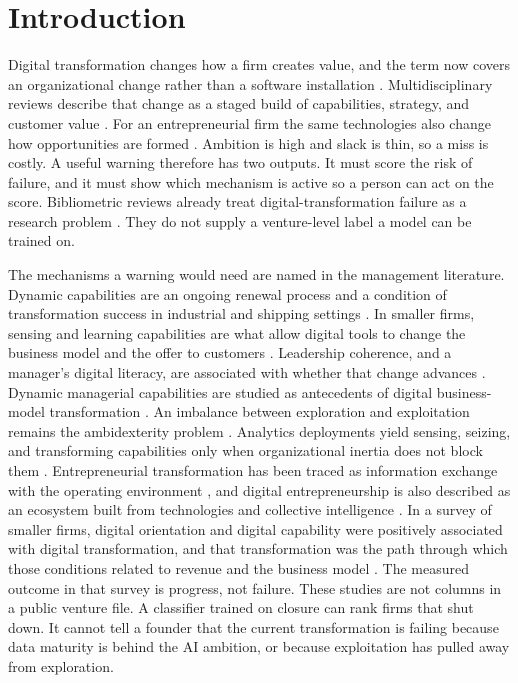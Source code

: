 \documentclass[preprint,12pt]{elsarticle}
\begin{document}
\section{Introduction}
Digital transformation changes how a firm creates value, and the term now covers an organizational change rather than a software installation \cite{vial2019,gong2021}. Multidisciplinary reviews describe that change as a staged build of capabilities, strategy, and customer value \cite{verhoef2021,matt2016}. For an entrepreneurial firm the same technologies also change how opportunities are formed \cite{nambisan2019}. Ambition is high and slack is thin, so a miss is costly. A useful warning therefore has two outputs. It must score the risk of failure, and it must show which mechanism is active so a person can act on the score. Bibliometric reviews already treat digital-transformation failure as a research problem \cite{oludapo2024}. They do not supply a venture-level label a model can be trained on.

The mechanisms a warning would need are named in the management literature. Dynamic capabilities are an ongoing renewal process \cite{warner2019} and a condition of transformation success in industrial and shipping settings \cite{ghosh2022,wohlleber2024}. In smaller firms, sensing and learning capabilities are what allow digital tools to change the business model and the offer to customers \cite{matarazzo2021}. Leadership coherence, and a manager's digital literacy, are associated with whether that change advances \cite{porfirio2021,destrian2025}. Dynamic managerial capabilities are studied as antecedents of digital business-model transformation \cite{heubeck2023}. An imbalance between exploration and exploitation remains the ambidexterity problem \cite{oreilly2013}. Analytics deployments yield sensing, seizing, and transforming capabilities only when organizational inertia does not block them \cite{mikalef2021}. Entrepreneurial transformation has been traced as information exchange with the operating environment \cite{gupta2022}, and digital entrepreneurship is also described as an ecosystem built from technologies and collective intelligence \cite{elia2020}. In a survey of smaller firms, digital orientation and digital capability were positively associated with digital transformation, and that transformation was the path through which those conditions related to revenue and the business model \cite{rupeika2022}. The measured outcome in that survey is progress, not failure. These studies are not columns in a public venture file. A classifier trained on closure can rank firms that shut down. It cannot tell a founder that the current transformation is failing because data maturity is behind the AI ambition, or because exploitation has pulled away from exploration.
\end{document}
